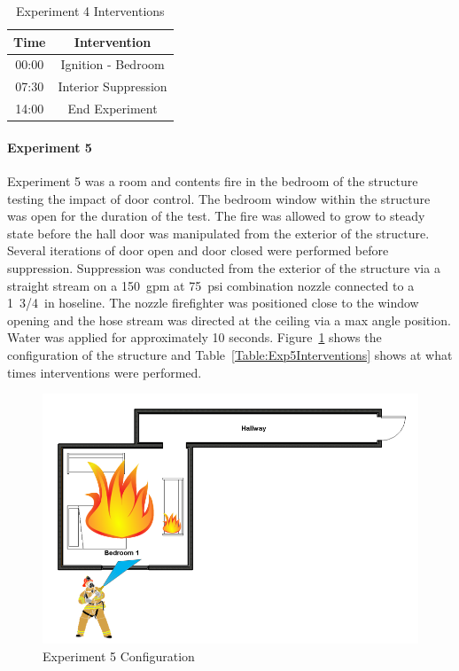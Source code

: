 \documentclass[12pt,oneside]{book}
\begin{document}
\begin{table}[H]
	\centering
	\caption{Experiment 4 Interventions}
	\begin{tabular}{|c|c|} 
		\hline
		Time & Intervention \\ \hline \hline
		00:00 & Ignition - Bedroom \\ \hline
		07:30 & Interior Suppression \\ \hline
		14:00 & End Experiment\\ \hline
	\end{tabular}
	\label{Table:Exp4Interventions}
\end{table}

\clearpage

\paragraph{Experiment 5} \mbox{}

Experiment 5 was a room and contents fire in the bedroom of the structure testing the impact of door control. The bedroom window within the structure was open for the duration of the test. The fire was allowed to grow to steady state before the hall door was manipulated from the exterior of the structure. Several iterations of door open and door closed were performed before suppression. Suppression was conducted from the exterior of the structure via a straight stream on a 150~gpm at 75~psi combination nozzle connected to a 1~3/4~in hoseline. The nozzle firefighter was positioned close to the window opening and the hose stream was directed at the ceiling via a max angle position. Water was applied for approximately 10 seconds. Figure~\ref{fig:Exp5Config} shows the configuration of the structure and Table~\ref{Table:Exp5Interventions} shows at what times interventions were performed.


\begin{figure}[H]
	\centering
	\includegraphics[width=5in]{Howard_Exp_5.png}
	\caption{Experiment 5 Configuration}
	\label{fig:Exp5Config}
\end{figure}
\end{document}
